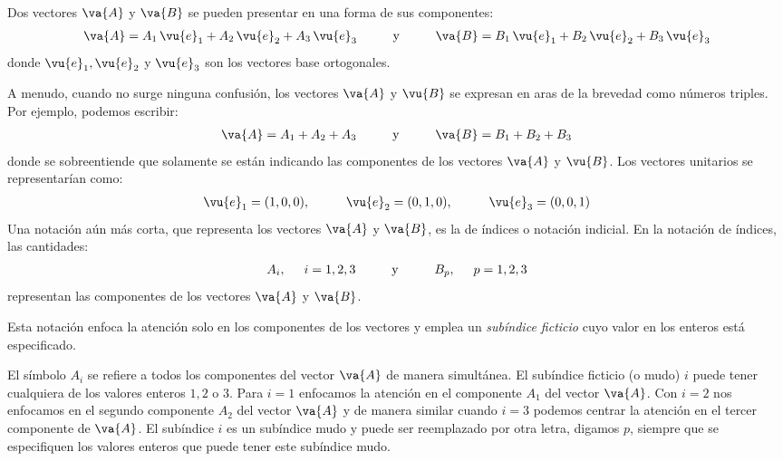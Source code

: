 Dos vectores $\va{A}$ y $\va{B}$ se pueden presentar en una forma de sus componentes:
\begin{align*}
\va{A} = A_{1} \, \vu{e}_{1} + A_{2} \, \vu{e}_{2} + A_{3} \, \vu{e}_{3} \hspace{1cm} \mbox{y} \hspace{1cm} \va{B} = B_{1} \, \vu{e}_{1} + B_{2} \, \vu{e}_{2} + B_{3} \, \vu{e}_{3}
\end{align*}
donde $\vu{e}_{1}, \vu{e}_{2}$ y $\vu{e}_{3}$ son los vectores base ortogonales.
\par
A menudo, cuando no surge ninguna confusión, los vectores $\va{A}$ y $\vu{B}$ se expresan en aras de la brevedad como números triples. Por ejemplo, podemos escribir:
\begin{align*}
\va{A} = A_{1} + A_{2} + A_{3}  \hspace{1cm} \mbox{y} \hspace{1cm} \va{B} = B_{1} + B_{2} + B_{3}
\end{align*}
donde se sobreentiende que solamente se están indicando las componentes de los vectores $\va{A}$ y $\vu{B}$. Los vectores unitarios se representarían como:
\begin{align*}
\vu{e}_{1} = (1, 0, 0), \hspace{1cm} \vu{e}_{2} = (0, 1, 0), \hspace{1cm} \vu{e}_{3} = (0, 0, 1)
\end{align*}
Una notación aún más corta, que representa los vectores $\va{A}$ y $\va{B}$, es la de índices o notación indicial. En la notación de índices, las cantidades:
\begin{align*}
A_{i}, \hspace{0.5cm} i = 1, 2, 3 \hspace{1cm} \mbox{y} \hspace{1cm} B_{p}, \hspace{0.5cm} p = 1, 2, 3
\end{align*}
representan las componentes de los vectores $\va{A}$ y $\va{B}$.
\par
Esta notación enfoca la atención solo en los componentes de los vectores y emplea un \emph{subíndice ficticio} cuyo valor en los enteros está especificado.
\par
El símbolo $A_{i}$ se refiere a todos los componentes del vector $\va{A}$ de manera simultánea. El subíndice ficticio (o mudo) $i$ puede tener cualquiera de los valores enteros $1, 2$ o $3$. Para $i = 1$ enfocamos la atención en el componente $A_{1}$ del vector $\va{A}$. Con $i = 2$ nos enfocamos en el segundo componente $A_{2}$ del vector $\va{A}$ y de manera similar cuando $i = 3$ podemos centrar la atención en el tercer componente de $\va{A}$. El subíndice $i$ es un subíndice mudo y puede ser reemplazado por otra letra, digamos $p$, siempre que se especifiquen los valores enteros que puede tener este subíndice mudo.
